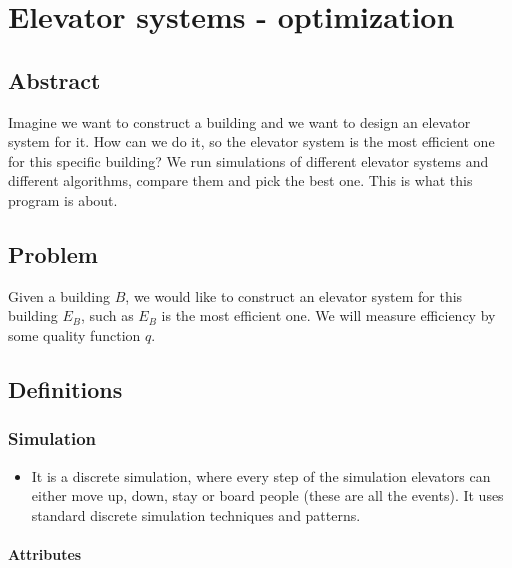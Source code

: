 \hypertarget{elevator-systems---optimization}{%
\section{Elevator systems -
optimization}\label{elevator-systems---optimization}}

\hypertarget{abstract}{%
\subsection{Abstract}\label{abstract}}

Imagine we want to construct a building and we want to design an
elevator system for it. How can we do it, so the elevator system is the
most efficient one for this specific building? We run simulations of
different elevator systems and different algorithms, compare them and
pick the best one. This is what this program is about.

\hypertarget{problem}{%
\subsection{Problem}\label{problem}}

Given a building \(B\), we would like to construct an elevator system
for this building \(E_B\), such as \(E_B\) is the most efficient one. We
will measure efficiency by some quality function \(q\).

\hypertarget{definitions}{%
\subsection{Definitions}\label{definitions}}

\hypertarget{simulation}{%
\subsubsection{\texorpdfstring{\textbf{Simulation}}{Simulation}}\label{simulation}}

\begin{itemize}
\tightlist
\item
  It is a discrete simulation, where every step of the simulation
  elevators can either move up, down, stay or board people (these are
  all the events). It uses standard discrete simulation techniques and
  patterns.
\end{itemize}

\hypertarget{attributes}{%
\paragraph{Attributes}\label{attributes}}

